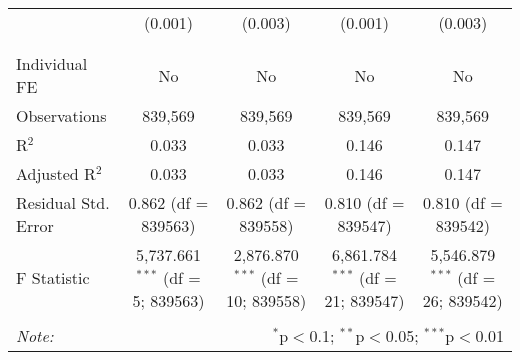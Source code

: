 \documentclass[
]{article}
\begin{document}
\begin{table}[!htbp]
{\begin{tabular}{@{\extracolsep{5pt}}lcccc}
  & (0.001) & (0.003) & (0.001) & (0.003) \\ 
  & & & & \\ 
\hline \\[-1.8ex] 
Individual FE & No & No & No & No \\ 
Observations & 839,569 & 839,569 & 839,569 & 839,569 \\ 
R$^{2}$ & 0.033 & 0.033 & 0.146 & 0.147 \\ 
Adjusted R$^{2}$ & 0.033 & 0.033 & 0.146 & 0.147 \\ 
Residual Std. Error & 0.862 (df = 839563) & 0.862 (df = 839558) & 0.810 (df = 839547) & 0.810 (df = 839542) \\ 
F Statistic & 5,737.661$^{***}$ (df = 5; 839563) & 2,876.870$^{***}$ (df = 10; 839558) & 6,861.784$^{***}$ (df = 21; 839547) & 5,546.879$^{***}$ (df = 26; 839542) \\ 
\hline 
\hline \\[-1.8ex] 
\textit{Note:}  & \multicolumn{4}{r}{$^{*}$p$<$0.1; $^{**}$p$<$0.05; $^{***}$p$<$0.01} \\ 
\end{tabular}
} 
\end{table} 
\newpage
\end{document}
